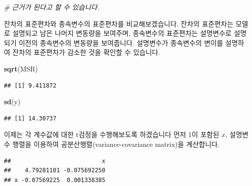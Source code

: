 \documentclass[]{book}
\newenvironment{Shaded}{\begin{snugshade}}{\end{snugshade}}
\newcommand{\CommentTok}[1]{\textcolor[rgb]{0.56,0.35,0.01}{\textit{#1}}}
\newcommand{\DecValTok}[1]{\textcolor[rgb]{0.00,0.00,0.81}{#1}}
\newcommand{\KeywordTok}[1]{\textcolor[rgb]{0.13,0.29,0.53}{\textbf{#1}}}
\newcommand{\NormalTok}[1]{#1}
\newcommand{\OperatorTok}[1]{\textcolor[rgb]{0.81,0.36,0.00}{\textbf{#1}}}
\newcommand{\StringTok}[1]{\textcolor[rgb]{0.31,0.60,0.02}{#1}}
\begin{document}
\begin{Shaded}
\begin{Highlighting}[]
                    \CommentTok{# 근거가 된다고 할 수 있습니다.}
\end{Highlighting}
\end{Shaded}

잔차의 표준편차와 종속변수의 표준편차를 비교해보겠습니다. 잔차의 표준편차는 모델로 설명되고 남은 나머지 변동량을 보여주며, 종속변수의 표준편차는 설명변수로 설명되기 이전의 종속변수의 변동량을 보여줍니다. 설명변수가 종속변수의 변이를 설명하여 잔차의 표준편차가 감소한 것을 확인할 수 있습니다.

\begin{Shaded}
\begin{Highlighting}[]
\KeywordTok{sqrt}\NormalTok{(MSR) }
\end{Highlighting}
\end{Shaded}

\begin{verbatim}
## [1] 9.411872
\end{verbatim}

\begin{Shaded}
\begin{Highlighting}[]
\KeywordTok{sd}\NormalTok{(y)}
\end{Highlighting}
\end{Shaded}

\begin{verbatim}
## [1] 14.30737
\end{verbatim}

이제는 각 계수값에 대한 t검정을 수행해보도록 하겠습니다 먼저 1이 포함된 \(x\), 설명변수 행렬을 이용하여 공분산행렬(variance-covariance matrix)을 계산합니다.

\begin{Shaded}
\end{Shaded}

\begin{verbatim}
##                          x
##    4.79281101 -0.075692250
## x -0.07569225  0.001338385
\end{verbatim}
\end{document}
